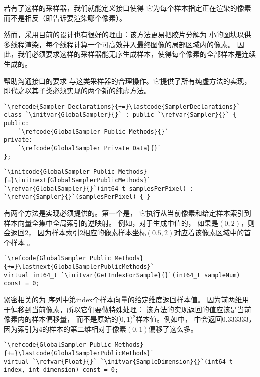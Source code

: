 若有了这样的采样器，我们就能定义接口使得
它为每个样本指定正在渲染的像素而不是相反（即告诉要渲染哪个像素）。

然而，采用目前的设计也有很好的理由：该方法更易把胶片分解为
小的图块以供多线程渲染，每个线程计算一个可高效并入最终图像的局部区域内的像素。
因此，我们必须要求这样的采样器能无序生成样本，使得每个像素的全部样本是连续生成的。

帮助沟通接口的要求
与这类采样器的合理操作。它提供了所有纯虚方法的实现，
即代之以其子类必须实现的两个新的纯虚方法。
\begin{lstlisting}
`\refcode{Sampler Declarations}{+=}\lastcode{SamplerDeclarations}`
class `\initvar{GlobalSampler}{}` : public `\refvar{Sampler}{}` {
public:
    `\refcode{GlobalSampler Public Methods}{}`
private:
    `\refcode{GlobalSampler Private Data}{}`
};
\end{lstlisting}
\begin{lstlisting}
`\initcode{GlobalSampler Public Methods}{=}\initnext{GlobalSamplerPublicMethods}`
`\refvar{GlobalSampler}{}`(int64_t samplesPerPixel) : `\refvar{Sampler}{}`(samplesPerPixel) { }
\end{lstlisting}

有两个方法是实现必须提供的。第一个是，
它执行从当前像素和给定样本索引到样本向量全集中全局索引的逆映射。
例如，对于生成中值的，
如果是$(0,2)$，则会返回2，
因为样本索引2相应的像素样本坐标$(0.5,2)$对应着该像素区域中的首个样本
。
\begin{lstlisting}
`\refcode{GlobalSampler Public Methods}{+=}\lastnext{GlobalSamplerPublicMethods}`
virtual int64_t `\initvar{GetIndexForSample}{}`(int64_t sampleNum) const = 0;
\end{lstlisting}

紧密相关的为
序列中第{\ttfamily index}个样本向量的给定维度返回样本值。
因为前两维用于偏移到当前像素，所以它们要做特殊处理：
该方法的实现返回的值应该是当前像素内的样本偏移量，
而不是原始的$[0,1)^2$样本值。例如中，
中会返回0.333333，
因为索引为4的样本的第二维相对于像素$(0,1)$偏移了这么多。
\begin{lstlisting}
`\refcode{GlobalSampler Public Methods}{+=}\lastcode{GlobalSamplerPublicMethods}`
virtual `\refvar{Float}{}` `\initvar{SampleDimension}{}`(int64_t index, int dimension) const = 0;
\end{lstlisting}

